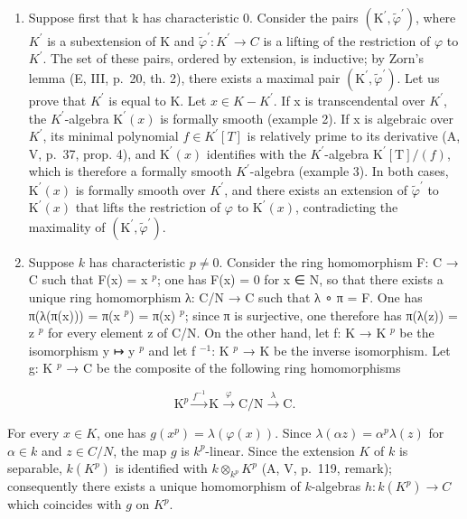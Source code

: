 \begin{enumerate}
\def\labelenumi{\Alph{enumi})}
\item
  Suppose first that k has characteristic 0. Consider the pairs \((\mathrm{K}^{\prime}, \tilde{\varphi}^{\prime})\), where \(K^{\prime}\) is a subextension of K and \(\tilde{\varphi}^{\prime}: K^{\prime} \to C\) is a lifting of the restriction of \(\varphi\) to \(K^{\prime}\). The set of these pairs, ordered by extension, is inductive; by Zorn's lemma (E, III, p.~20, th. 2), there exists a maximal pair \((\mathrm{K}^{\prime}, \tilde{\varphi}^{\prime})\). Let us prove that \(K^{\prime}\) is equal to K. Let \(x \in K - K^{\prime}\). If x is transcendental over \(K^{\prime}\), the \(K^{\prime}\)-algebra \(\mathrm{K}^{\prime}(x)\) is formally smooth (example 2). If x is algebraic over \(K^{\prime}\), its minimal polynomial \(f \in K^{\prime}[T]\) is relatively prime to its derivative (A, V, p.~37, prop. 4), and \(\mathrm{K}^{\prime}(x)\) identifies with the \(K^{\prime}\)-algebra \(\mathrm{K}^{\prime}[\mathrm{T}]/(f)\), which is therefore a formally smooth \(K^{\prime}\)-algebra (example 3). In both cases, \(\mathrm{K}^{\prime}(x)\) is formally smooth over \(K^{\prime}\), and there exists an extension of \(\tilde{\varphi}^{\prime}\) to \(\mathrm{K}^{\prime}(x)\) that lifts the restriction of \(\varphi\) to \(\mathrm{K}^{\prime}(x)\), contradicting the maximality of \((\mathrm{K}^{\prime}, \tilde{\varphi}^{\prime})\).
\item
  Suppose \(k\) has characteristic \(p \neq 0\). Consider the ring homomorphism F: C → C such that F(x) = x \(^{p}\); one has F(x) = 0 for x ∈ N, so that there exists a unique ring homomorphism λ: C/N → C such that λ ∘ π = F. One has π(λ(π(x))) = π(x \(^{p}\)) = π(x) \(^{p}\); since π is surjective, one therefore has π(λ(z)) = z \(^{p}\) for every element z of C/N. On the other hand, let f: K → K \(^{p}\) be the isomorphism y ↦ y \(^{p}\) and let f \(^{-1}\): K \(^{p}\) → K be the inverse isomorphism. Let g: K \(^{p}\) → C be the composite of the following ring homomorphisms
\end{enumerate}

\[
\mathrm{K} ^ {p} \xrightarrow {f ^ {- 1}} \mathrm{K} \xrightarrow {\varphi} \mathrm{C} / \mathrm{N} \xrightarrow {\lambda} \mathrm{C}.
\]

For every \(x \in K\), one has \(g(x^{p}) = \lambda(\varphi(x))\). Since \(\lambda(\alpha z) = \alpha^{p}\lambda(z)\) for \(\alpha \in k\) and \(z \in C/N\), the map \(g\) is \(k^{p}\)-linear. Since the extension \(K\) of \(k\) is separable, \(k(K^{p})\) is identified with \(k \otimes_{k^{p}} K^{p}\) (A, V, p.~119, remark); consequently there exists a unique homomorphism of \(k\)-algebras \(h: k(K^{p}) \to C\) which coincides with \(g\) on \(K^{p}\).

